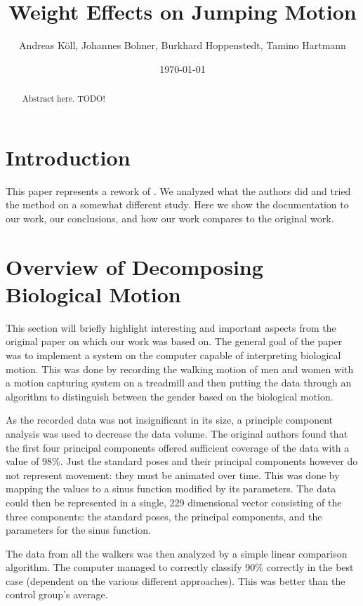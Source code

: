 \documentclass[a4paper]{article}
\begin{document}
\title{Weight Effects on Jumping Motion}
\author{Andreas Köll, Johannes Bohner, Burkhard Hoppenstedt, Tamino Hartmann}
\date{\today}

\maketitle

\begin{abstract}
Abstract here. TODO!
\end{abstract}
\newpage

\section{Introduction}

This paper represents a rework of \cite{origin}.
We analyzed what the authors did and tried the method on a somewhat different study.
Here we show the documentation to our work, our conclusions, and how our work compares to the original work.

\section{Overview of Decomposing Biological Motion}

This section will briefly highlight interesting and important aspects from the original paper on which our work was based on.
The general goal of the paper was to implement a system on the computer capable of interpreting biological motion.
This was done by recording the walking motion of men and women with a motion capturing system on a treadmill and then putting the data through an algorithm to distinguish between the gender based on the biological motion.

As the recorded data was not insignificant in its size, a principle component analysis was used to decrease the data volume.
The original authors found that the first four principal components offered sufficient coverage of the data with a value of 98\%.
Just the standard poses and their principal components however do not represent movement: they must be animated over time.
This was done by mapping the values to a sinus function modified by its parameters.
The data could then be represented in a single, 229 dimensional vector consisting of the three components: the standard poses, the principal components, and the parameters for the sinus function.

The data from all the walkers was then analyzed by a simple linear comparison algorithm.
The computer managed to correctly classify 90\% correctly in the best case (dependent on the various different approaches).
This was better than the control group's average.
\end{document}
